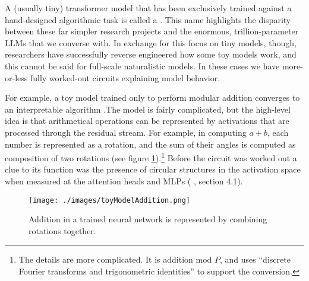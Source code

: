 A (usually tiny) transformer model that has been exclusively trained against a
hand-designed algorithmic task is called a . This name
highlights the disparity between these far simpler research projects and the
enormous, trillion-parameter LLMs that we converse with. In exchange for this
focus on tiny models, though, researchers have successfully reverse engineered
how some toy models work, and this cannot be said for full-scale naturalistic
models. In these cases we have more-or-less fully worked-out circuits
explaining model behavior.

For example, a toy model trained only to perform modular addition converges to
an interpretable algorithm \cite{nanda2023progress}.The model is fairly
complicated, but the high-level idea is that arithmetical operations can be
represented by activations that are processed through the residual stream. For
example, in computing $a + b$, each number is represented as a rotation, and
the sum of their angles is computed as composition of two rotations (see figure
\ref{toyModelAddition}).\footnote{The details are more complicated. It is
addition mod $P$, and uses ``discrete Fourier transforms and trigonometric
identities'' \cite{nanda2023progress} to support the conversion.} Before the
circuit was worked out a clue to its function was the presence of circular
structures in the activation space when measured at the attention heads and
MLPs (\cite{nanda2023progress} , section 4.1).

\begin{figure}[ht]
\centering
\texttt{[image: ./images/toyModelAddition.png]}
\caption[From \cite{nanda2023progress} .]{ Addition in a trained neural network
      is represented by combining rotations together. }
\label{toyModelAddition}
\end{figure}



